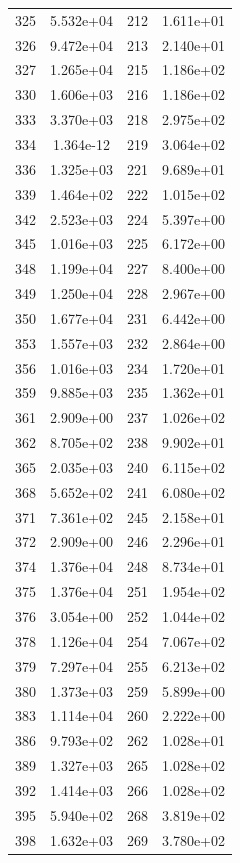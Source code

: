\documentclass[12pt]{article}
\begin{document}
\begin{longtable}{@{}cccc@{}}
325 & 5.532e+04 & 212 & 1.611e+01 \\
326 & 9.472e+04 & 213 & 2.140e+01 \\
327 & 1.265e+04 & 215 & 1.186e+02 \\
330 & 1.606e+03 & 216 & 1.186e+02 \\
333 & 3.370e+03 & 218 & 2.975e+02 \\
334 & 1.364e-12 & 219 & 3.064e+02 \\
336 & 1.325e+03 & 221 & 9.689e+01 \\
339 & 1.464e+02 & 222 & 1.015e+02 \\
342 & 2.523e+03 & 224 & 5.397e+00 \\
345 & 1.016e+03 & 225 & 6.172e+00 \\
348 & 1.199e+04 & 227 & 8.400e+00 \\
349 & 1.250e+04 & 228 & 2.967e+00 \\
350 & 1.677e+04 & 231 & 6.442e+00 \\
353 & 1.557e+03 & 232 & 2.864e+00 \\
356 & 1.016e+03 & 234 & 1.720e+01 \\
359 & 9.885e+03 & 235 & 1.362e+01 \\
361 & 2.909e+00 & 237 & 1.026e+02 \\
362 & 8.705e+02 & 238 & 9.902e+01 \\
365 & 2.035e+03 & 240 & 6.115e+02 \\
368 & 5.652e+02 & 241 & 6.080e+02 \\
371 & 7.361e+02 & 245 & 2.158e+01 \\
372 & 2.909e+00 & 246 & 2.296e+01 \\
374 & 1.376e+04 & 248 & 8.734e+01 \\
375 & 1.376e+04 & 251 & 1.954e+02 \\
376 & 3.054e+00 & 252 & 1.044e+02 \\
378 & 1.126e+04 & 254 & 7.067e+02 \\
379 & 7.297e+04 & 255 & 6.213e+02 \\
380 & 1.373e+03 & 259 & 5.899e+00 \\
383 & 1.114e+04 & 260 & 2.222e+00 \\
386 & 9.793e+02 & 262 & 1.028e+01 \\
389 & 1.327e+03 & 265 & 1.028e+02 \\
392 & 1.414e+03 & 266 & 1.028e+02 \\
395 & 5.940e+02 & 268 & 3.819e+02 \\
398 & 1.632e+03 & 269 & 3.780e+02 \\

\end{longtable}
\end{document}
